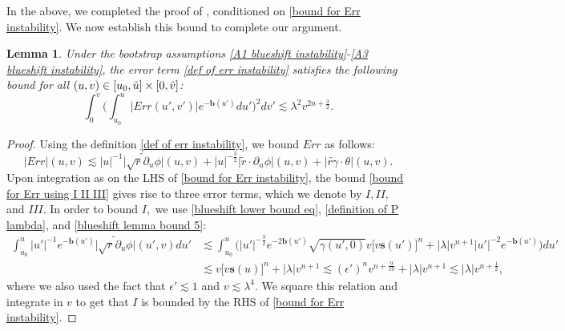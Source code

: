 \documentclass[11pt]{article}
\newtheorem{lemma}{Lemma}[section]
\numberwithin{equation}{section}
\begin{document}
In the above, we completed the proof of , conditioned on \eqref{bound for Err instability}. We now establish this bound to complete our argument.
\begin{lemma}\label{bound for Err instability lemma}
    Under the bootstrap assumptions \eqref{A1 blueshift instability}-\eqref{A3 blueshift instability}, the 
    error term \eqref{def of err instability} satisfies the following bound for all $(u,v)\in[u_0,\Tilde{u}]\times[0,\Tilde{v}]$:
    \begin{equation}\label{bound for Err instability}
        \int_0^v\bigg(\int_{u_0}^u\big|Err(u',v')\big|e^{-\mathbf{b}(u')}du'\bigg)^2dv'\lesssim\lambda^2v^{2n+\frac{3}{2}}.
    \end{equation}
\end{lemma}
\begin{proof}
    Using the definition \eqref{def of err instability}, we bound $Err$ as follows:
    \begin{equation}\label{bound for Err using I II III}
        \big|Err\big|(u,v)\lesssim|u|^{-1}\big|\widetilde{\sqrt{r}\partial_u\phi}\big|(u,v)+|u|^{-\frac{3}{2}}\big|\widetilde{r}\cdot\partial_u\phi\big|(u,v)+\big|\widetilde{r\gamma}\cdot\theta\big|(u,v).
    \end{equation}
    Upon integration as on the LHS of \eqref{bound for Err instability}, the bound \eqref{bound for Err using I II III} gives rise to three error terms, which we denote by $I,II,$ and $III.$ In order to bound $I,$ we use \eqref{blueshift lower bound eq}, \eqref{definition of P lambda}, and \eqref{blueshift lemma bound 5}:
    \begin{align*}
        \int_{u_0}^u|u'|^{-1}e^{-\mathbf{b}(u')}\big|\widetilde{\sqrt{r}\partial_u\phi}\big|(u',v)du'&\lesssim\int_{u_0}^u\bigg(|u'|^{-\frac{3}{2}}e^{-2\mathbf{b}(u')}\sqrt{\gamma(u',0)}v\big[v\mathbf{s}(u')\big]^n+|\lambda|v^{n+1}|u'|^{-2}e^{-\mathbf{b}(u')}\bigg)du'\\
        &\lesssim v\big[v\mathbf{s}(u)\big]^n+|\lambda|v^{n+1}\lesssim(\epsilon')^nv^{n+\frac{9}{10}}+|\lambda|v^{n+1}\lesssim|\lambda|v^{n+\frac{1}{2}},
    \end{align*}
    where we also used the fact that $\epsilon'\lesssim1$ and $v\lesssim\lambda^4.$ We square this relation and integrate in $v$ to get that $I$ is bounded by the RHS of \eqref{bound for Err instability}.


\end{proof}
\end{document}
